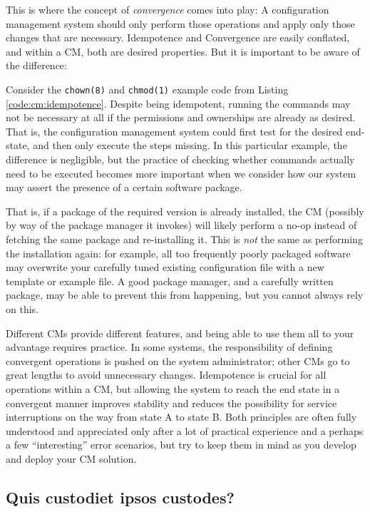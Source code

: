 This is where the concept of {\em
convergence} comes into play:  A
configuration management system should only perform
those operations and apply only those changes that are
necessary.  Idempotence and Convergence are easily
conflated, and within a CM, both are desired
properties.  But it is important to be aware of the
difference:

Consider the \verb+chown(8)+ and \verb+chmod(1)+
example code from Listing \ref{code:cm:idempotence}.
Despite being idempotent, running the commands may not
be necessary at all if the permissions and ownerships
are already as desired.  That is, the configuration
management system could first test for the desired
end-state, and then only execute the steps missing.
In this particular example, the difference is
negligible, but the practice of checking whether
commands actually need to be executed becomes more
important when we consider how our system may assert
the presence of a certain software package.

That is, if a package of the required version is
already installed, the CM (possibly by way of the
package manager it invokes) will likely perform a
no-op instead of fetching the same package and
re-installing it.  This is {\em not} the same as
performing the installation again:  for example, all
too frequently poorly packaged software may overwrite
your carefully tuned existing configuration file with
a new template or example file.  A good package
manager, and a carefully written package, may be able
to prevent this from happening, but you cannot always
rely on this.

Different CMs provide different features, and being
able to use them all to your advantage requires
practice.  In some systems, the responsibility of
defining convergent operations is pushed on the system
administrator; other CMs go to great lengths to avoid
unnecessary changes.  Idempotence is crucial for all
operations within a CM, but allowing the system to
reach the end state in a convergent manner improves
stability and reduces the possibility for service
interruptions on the way from state A to state B.
Both principles are often fully understood and
appreciated only after a lot of practical experience
and a perhaps a few ``interesting'' error scenarios,
but try to keep them in mind as you develop and deploy
your CM solution.

\subsection{Quis custodiet ipsos custodes?}
\label{configuration-management:quis-custodiet}

